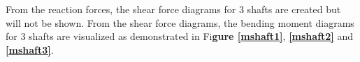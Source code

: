 From the reaction forces, the shear force diagrams for 3 shafts are created but will not be shown. From the shear force diagrams, the bending moment diagrams for 3 shafts are visualized as demonstrated in Fi\textbf{gure \ref{mshaft1}}, \textbf{\ref{mshaft2}} and \textbf{\ref{mshaft3}}. %
